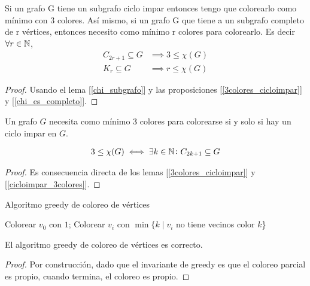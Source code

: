 \begin{lemma}\label{cicloimpar_3colores}
Si un grafo G tiene un subgrafo ciclo impar entonces tengo que colorearlo como mínimo con 3 colores.
Así mismo, si un grafo G que tiene a un subgrafo completo de r vértices, entonces necesito como mínimo r colores para colorearlo. Es decir $\forall r \in \mathbb{N}$,
\begin{align}
        C_{2r+1} \subseteq G &\implies 3 \le \chi(G)\\
        K_r \subseteq G      &\implies r \le \chi(G)
\end{align}
\end{lemma}
\begin{proof}
Usando el lema [\ref{chi_subgrafo}] y las proposiciones [\ref{3colores_cicloimpar}] y [\ref{chi_es_completo}].
\end{proof}

\begin{proposition}
 Un grafo $G$ necesita como mínimo 3 colores para colorearse si y solo si hay un ciclo impar en $G$.

\begin{align}
    3 \le \chi(G) \iff \exists k \in \mathbb{N} \colon C_{2k+1} \subseteq G
\end{align}
\end{proposition}

\begin{proof}
Es consecuencia directa de los lemas [\ref{3colores_cicloimpar}] y [\ref{cicloimpar_3colores}].
\end{proof}


\begin{algorithm}
\caption{Algoritmo greedy de coloreo de vértices}
\begin{algorithmic}
    \State Colorear $v_0$ con $1$;
    \State Colorear $v_i$ con $\min \{k \mid v_i $ no tiene vecinos color $k$\}
    \EndFor
\EndFunction
\end{algorithmic}
\end{algorithm}

\begin{proposition}
El algoritmo greedy de coloreo de vértices es correcto.
\end{proposition}
\begin{proof}
Por construcción, dado que el invariante de greedy es que el coloreo parcial es propio, cuando termina, el coloreo es propio.
\end{proof}

